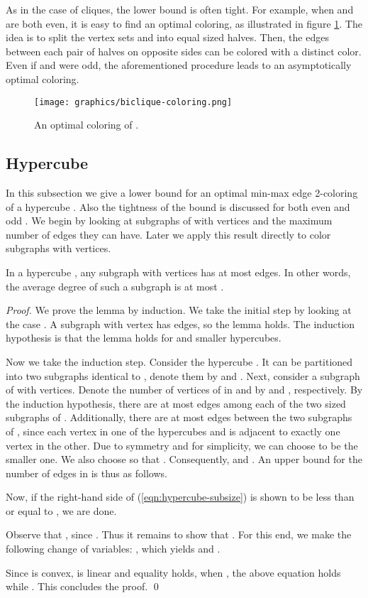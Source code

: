 \documentclass[runningheads, a4paper]{llncs}
\begin{document}
As in the case of cliques, the lower bound is often tight. For example, when  and  are both even, it is easy to find an optimal coloring, as illustrated in figure \ref{img:biclique-coloring}. The idea is to split the vertex sets  and  into equal sized halves. Then, the edges between each pair of halves on opposite sides can be colored with a distinct color. Even if  and  were odd, the aforementioned procedure leads to an asymptotically optimal coloring.

\begin{figure}[htb]
\centering \texttt{[image: graphics/biclique-coloring.png]}
\caption{An optimal coloring of .}\label{img:biclique-coloring}
\end{figure}

\subsection{Hypercube}\label{sssect:hypercube}

In this subsection we give a lower bound for an optimal min-max edge 2-coloring of a hypercube . Also the tightness of the bound is discussed for both even and odd . We begin by looking at subgraphs of  with  vertices and the maximum number of edges they can have. Later we apply this result directly to color subgraphs with  vertices.

\begin{lemma}\label{lemma:hypercube1}
In a hypercube , any subgraph with  vertices has at most  edges. In other words, the average degree of such a subgraph is at most .
\end{lemma}
\begin{proof}
We prove the lemma by induction. We take the initial step by looking at the case . A subgraph with  vertex has  edges, so the lemma holds. The induction hypothesis is that the lemma holds for  and smaller hypercubes.

Now we take the induction step. Consider the hypercube . It can be partitioned into two subgraphs identical to , denote them by  and . Next, consider a subgraph  of  with  vertices. Denote the number of vertices of  in  and  by  and , respectively. By the induction hypothesis, there are at most  edges among each of the two  sized subgraphs of . Additionally, there are at most  edges between the two subgraphs of , since each vertex in one of the hypercubes  and  is adjacent to exactly one vertex in the other. Due to symmetry and for simplicity, we can choose  to be the smaller one. We also choose  so that . Consequently,  and . An upper bound for the number of edges in  is thus as follows.

Now, if the right-hand side of (\ref{eqn:hypercube-subsize}) is shown to be less than or equal to , we are done.

Observe that , since . Thus it remains to show that . For this end, we make the following change of variables: , which yields  and .

Since  is convex,  is linear and equality holds, when , the above equation holds while . This concludes the proof. \qed
\end{proof}
\end{document}

